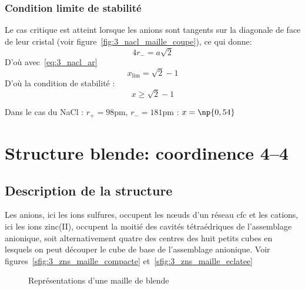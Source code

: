 \subsubsection{Condition limite de stabilité}
Le cas critique est atteint lorsque les anions sont tangents sur la diagonale de face
de leur cristal (voir figure~\ref{fig:3_nacl_maille_coupe}), ce qui donne:
\begin{equation}
    4r_- = a\sqrt{2}
    \label{eq:3_limite_ar-}
\end{equation}
D'où avec~\ref{eq:3_nacl_ar}
\begin{equation}
    x_\text{lim} = \sqrt{2} - 1
\end{equation}
D'où la condition de stabilité :
\begin{equation}
    \boxed{x \geq \sqrt{2} - 1}
    \label{eq:3_stab_x}
\end{equation}

Dans le cas du NaCl : $r_+ = 98$pm, $r_- = 181$pm : $x = \np{0,54}$


\section{Structure blende: coordinence 4\---4}
\subsection{Description de la structure}
Les anions, ici les ions sulfures, occupent les n\oe uds d'un réseau cfc et les cations,
ici les ions zinc(II), occupent la moitié des cavités tétraédriques de l’assemblage
anionique, soit alternativement quatre des centres des huit petits cubes en lesquels on peut
découper le cube de base de l’assemblage anionique. Voir figures~\ref{sfig:3_zns_maille_compacte}
et~\ref{sfig:3_zns_maille_eclatee}
\begin{figure}
    \centering
    \qquad
    \qquad
    \caption{Représentations d'une maille de blende}\label{fig:3_zns}
\end{figure}



